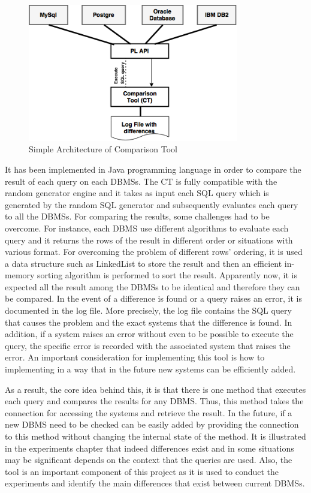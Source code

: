  \begin{figure} 
      \centering
      \includegraphics[width=\textwidth,height=6cm]{Images/Chapter4/2-ComparisonTool}
      \caption{Simple Architecture of Comparison Tool}
      \label{fig:counting-methods}
  \end{figure}

It has been implemented in Java programming language in order to compare the result of each query on each DBMSs. The CT is fully compatible with the random generator engine and it takes as input each SQL query which is generated by the random SQL generator and subsequently evaluates each query to all the DBMSs. For comparing the results, some challenges had to be overcome. For instance, each DBMS use different algorithms to evaluate each query and it returns the rows of the result in different order or situations with various format. For overcoming  the problem of different rows’ ordering, it is used a data structure such as LinkedList to store the result and then an efficient in-memory sorting algorithm is performed to sort the result. Apparently now, it is expected all the result among the DBMSs to be identical and therefore they can be compared. In the event of a difference is found or a query raises an error, it is documented in the log file. More precisely, the log file contains the SQL query that causes the problem and the exact systems that the difference is found. In addition, if a system raises an error without even to be possible to execute the query, the specific error is recorded with the associated system that raises the error. An important consideration for implementing this tool is how to implementing in a way that in the future new systems can be efficiently added. 

As a result, the core idea behind this, it is that there is one method that executes each query and compares the results for any DBMS. Thus, this method takes the connection for accessing the systems and retrieve the result. In the future, if a new DBMS need to be checked can be easily added by providing the connection to this method without changing the internal state of the method.  
 It is illustrated in the experiments chapter  that indeed differences exist and in some situations may be significant depends on the context that the queries are used. Also, the tool is an important component of this project as it is used to conduct the experiments and identify the main differences that exist between current DBMSs. 

